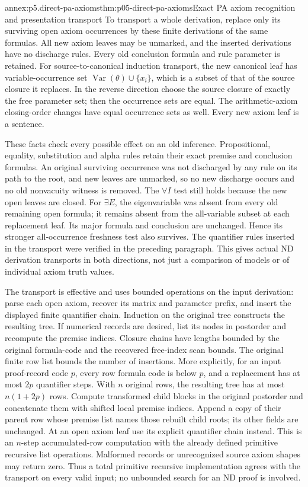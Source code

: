\begin{annexitem}{annex:p5.direct-pa-axioms}{thm:p05-direct-pa-axioms}{Exact PA axiom recognition and presentation transport}
To transport a whole derivation, replace only its surviving open axiom
occurrences by these finite derivations of the same formulas.  All new
axiom leaves may be unmarked, and the inserted derivations have no discharge
rules.  Every old conclusion formula and rule parameter is retained.
For source-to-canonical induction transport, the new canonical leaf has
variable-occurrence set
\(\operatorname{Var}(\theta)\cup\{x_i\}\), which is a subset of that
of the source closure it replaces.  In the reverse direction choose the
source closure of exactly the free parameter set; then the occurrence sets
are equal.  The arithmetic-axiom closing-order changes have equal occurrence
sets as well.  Every new axiom leaf is a sentence.

These facts check every possible effect on an old inference.  Propositional,
equality, substitution and alpha rules retain their exact premise and
conclusion formulas.  An original surviving occurrence was not discharged
by any rule on its path to the root, and new leaves are unmarked, so no
new discharge occurs and no old nonvacuity witness is removed.  The
\(\forall I\) test still holds because the new open leaves are closed.
For \(\exists E\), the eigenvariable was absent from every old remaining
open formula; it remains absent from the all-variable subset at each
replacement leaf.  Its major formula and conclusion are unchanged.
Hence its stronger all-occurrence freshness test also survives.  The
quantifier rules inserted in the transport were verified in the preceding
paragraph.  This gives actual ND derivation transports in both directions,
not just a comparison of models or of individual axiom truth values.

The transport is effective and uses bounded operations on the input
derivation: parse each open axiom, recover its matrix and parameter prefix,
and insert the displayed finite quantifier chain.  Induction on the original
tree constructs the resulting tree.  If numerical records are desired,
list its nodes in postorder and recompute the premise indices.  Closure
chains have lengths bounded by the original formula-code and the recovered
free-index scan bounds.  The original finite row list bounds the number of
insertions.  More explicitly, for an input proof-record code \(p\), every
row formula code is below \(p\), and a replacement has at most \(2p\)
quantifier steps.  With \(n\) original rows, the resulting tree has at
most \(n(1+2p)\) rows.  Compute transformed child blocks in the original
postorder and concatenate them with shifted local premise indices.  Append
a copy of their parent row whose premise list names those rebuilt child
roots; its other fields are unchanged.  At an open axiom leaf use its
explicit quantifier chain instead.  This is an \(n\)-step accumulated-row computation with
the already defined primitive recursive list operations.  Malformed
records or unrecognized source axiom shapes may return zero.  Thus a
total primitive recursive implementation agrees with the transport on
every valid input; no unbounded search for an ND proof is involved.


\end{annexitem}
